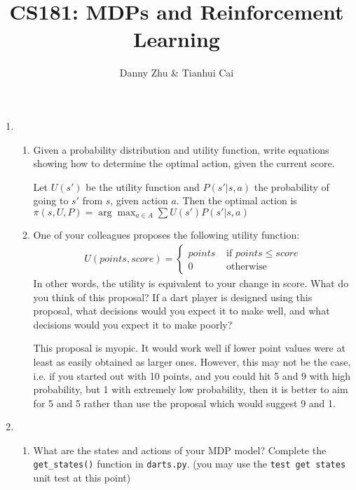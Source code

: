 \documentclass{article}
\title{CS181: MDPs and Reinforcement Learning}
\author{Danny Zhu \& Tianhui Cai}
\begin{document}
\maketitle
\begin{enumerate}
\item 
\begin{enumerate}
\item {Given a probability distribution and utility function, write
  equations showing how to determine the optimal action, given the
  current score.}

  Let $U(s')$ be the utility function and $P(s'|s,a)$ the probability 
  of going to $s'$ from $s$, given action $a$. 
  Then the optimal action is
  $\pi(s,U,P)=\arg\max_{a\in A} \sum U(s')P(s'|s,a)$


\item {One of your colleagues proposes the following utility function:}
  \begin{align*}
  U(points,score)=
  \begin{cases}
  points & \text{ if } points \leq score\\
  0 & \text{ otherwise}
  \end{cases}
  \end{align*}
  {In other words, the utility is equivalent to your change in score. What
  do you think of this proposal? If a dart player is designed using this
  proposal, what decisions would you expect it to make well, and what
  decisions would you expect it to make poorly?}

  This proposal is myopic. It would work well if lower point values were at least 
  as easily obtained as larger ones. However, this may not be the case, i.e. if 
  you started out with 10 points, and you could hit 5 and 9 with high probability,
  but 1 with extremely low probability, then it is better to aim for 5 and 5 
  rather than use the proposal which would suggest 9 and 1. 
  \end{enumerate}

\item
  \begin{enumerate}
  \item {What are the states and actions of your MDP model?
  Complete the \texttt{get\_states()} function in \texttt{darts.py}. (you may use
  the \texttt{test get states} unit test at this point)}


\end{enumerate}
\end{enumerate}
\end{document}
